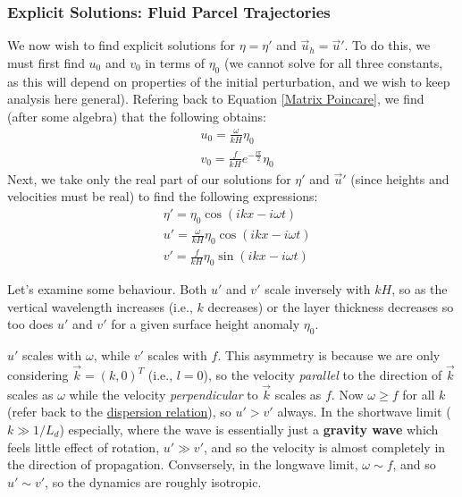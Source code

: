 \subsubsection{Explicit Solutions: Fluid Parcel Trajectories}

We now wish to find explicit solutions for \(\eta=\eta'\) and \(\vec{u}_h=\vec{u}'\). To do this, we must first find \(u_0\) and \(v_0\) in terms of \(\eta_0\) (we cannot solve for all three constants, as this will depend on properties of the initial perturbation, and we wish to keep analysis here general). Refering back to Equation \ref{Matrix Poincare}, we find (after some algebra) that the following obtains:
\begin{align*}
    &u_0 = \frac{\omega}{kH}\eta_0
    \\
    &v_0 = \frac{f}{kH}e^{-\frac{i\pi}{2}}\eta_0
\end{align*}
Next, we take only the real part of our solutions for \(\eta'\) and \(\vec{u}'\) (since heights and velocities must be real) to find the following expressions:
\begin{equation}
    \label{eq IG explicit}
    \begin{aligned}
    &\eta' = \eta_0 \cos(ikx-i\omega t)
    \\
    &u' = \frac{\omega}{kH}\eta_0 \cos(ikx-i\omega t)
    \\
    &v' = \frac{f}{kH}\eta_0 \sin(ikx-i\omega t)
    \end{aligned}
\end{equation}


Let's examine some behaviour. Both \(u'\) and \(v'\) scale inversely with \(kH\), so as the vertical wavelength increases (i.e., \(k\) decreases) or the layer thickness decreases so too does \(u'\) and \(v'\) for a given surface height anomaly \(\eta_0\). 

\(u'\) scales with \(\omega\), while \(v'\) scales with \(f\). This asymmetry is because we are only considering \(\vec{k}=(k,0)^T\) (i.e., \(l=0\)), so the velocity \textit{parallel} to the direction of \(\vec{k}\) scales as \(\omega\) while the velocity \textit{perpendicular} to \(\vec{k}\) scales as \(f\). Now \(\omega\geq f\) for all \(k\) (refer back to the \hyperref[IG SW Box]{dispersion relation}), so \(u'>v'\) always. In the shortwave limit (\(k\gg 1/L_d\)) especially, where the wave is essentially just a \textbf{gravity wave} which feels little effect of rotation, \(u'\gg v'\), and so the velocity is almost completely in the direction of propagation. Convsersely, in the longwave limit, \(\omega\sim f\), and so \(u'\sim v'\), so the dynamics are roughly isotropic.  


